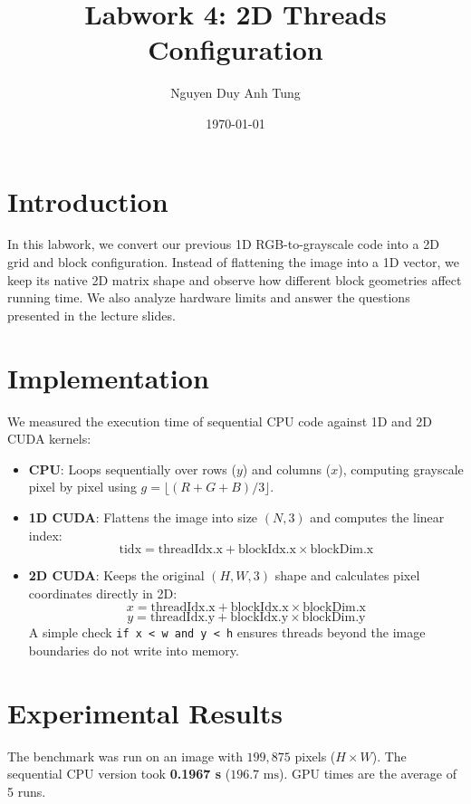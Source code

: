 \documentclass{report}
\title{Labwork 4: 2D Threads Configuration}
\author{Nguyen Duy Anh Tung}
\date{\today}
\begin{document}
\maketitle

\section{Introduction}
In this labwork, we convert our previous 1D RGB-to-grayscale code into a 2D grid and block configuration. Instead of flattening the image into a 1D vector, we keep its native 2D matrix shape and observe how different block geometries affect running time. We also analyze hardware limits and answer the questions presented in the lecture slides.

\section{Implementation}
We measured the execution time of sequential CPU code against 1D and 2D CUDA kernels:
\begin{itemize}
    \item \textbf{CPU}: Loops sequentially over rows ($y$) and columns ($x$), computing grayscale pixel by pixel using $g = \lfloor(R + G + B) / 3\rfloor$.
    \item \textbf{1D CUDA}: Flattens the image into size $(N, 3)$ and computes the linear index:
    \[
    \text{tidx} = \text{threadIdx.x} + \text{blockIdx.x} \times \text{blockDim.x}
    \]
    \item \textbf{2D CUDA}: Keeps the original $(H, W, 3)$ shape and calculates pixel coordinates directly in 2D:
    \[
    x = \text{threadIdx.x} + \text{blockIdx.x} \times \text{blockDim.x}
    \]
    \[
    y = \text{threadIdx.y} + \text{blockIdx.y} \times \text{blockDim.y}
    \]
    A simple check \texttt{if x < w and y < h} ensures threads beyond the image boundaries do not write into memory.
\end{itemize}

\section{Experimental Results}
The benchmark was run on an image with $199,875$ pixels ($H \times W$). The sequential CPU version took \textbf{0.1967 s} ($196.7\text{ ms}$). GPU times are the average of 5 runs.
\end{document}
